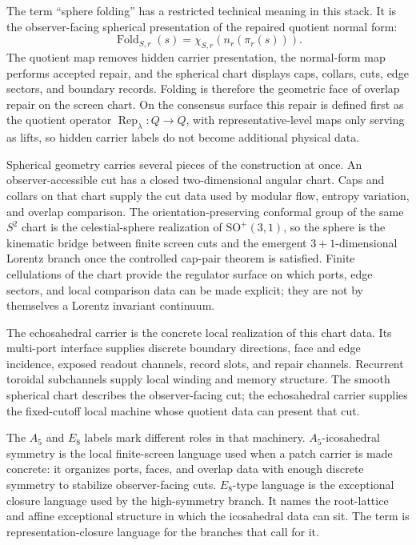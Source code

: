 \documentclass[11pt]{article}
\begin{document}
The term ``sphere folding'' has a restricted technical meaning in this stack. It is the
observer-facing spherical presentation of the repaired quotient normal form:
\[
\operatorname{Fold}_{S,r}(s)=\chi_{S,r}\!\left(n_r(\pi_r(s))\right).
\]
The quotient map removes hidden carrier presentation, the normal-form map performs accepted
repair, and the spherical chart displays caps, collars, cuts, edge sectors, and boundary records.
Folding is therefore the geometric face of overlap repair on the screen chart.
On the consensus surface this repair is defined first as the quotient operator
\(\operatorname{Rep}_\lambda:Q\to Q\), with representative-level maps only serving as lifts, so
hidden carrier labels do not become additional physical data.

Spherical geometry carries several pieces of the construction at once. An observer-accessible cut
has a closed two-dimensional angular chart. Caps and collars on that chart supply the cut data used
by modular flow, entropy variation, and overlap comparison. The orientation-preserving conformal
group of the same \(S^2\) chart is the celestial-sphere realization of
\(\mathrm{SO}^+(3,1)\), so the sphere is the kinematic bridge between finite screen cuts and the
emergent \(3+1\)-dimensional Lorentz branch once the controlled cap-pair theorem is
satisfied. Finite cellulations of the chart provide the regulator surface on which ports, edge
sectors, and local comparison data can be made explicit; they are not by themselves a Lorentz
invariant continuum.

The echosahedral carrier is the concrete local realization of this chart data. Its multi-port
interface supplies discrete boundary directions, face and edge incidence, exposed readout
channels, record slots, and repair channels. Recurrent toroidal subchannels supply local winding
and memory structure. The smooth spherical chart describes the observer-facing cut; the
echosahedral carrier supplies the fixed-cutoff local machine whose quotient data can present that
cut.

The \(A_5\) and \(E_8\) labels mark different roles in that machinery. \(A_5\)-icosahedral symmetry
is the local finite-screen language used when a patch carrier is made concrete: it organizes ports,
faces, and overlap data with enough discrete symmetry to stabilize observer-facing cuts.
\(E_8\)-type language is the exceptional closure language used by the high-symmetry branch. It names
the root-lattice and affine exceptional structure in which the icosahedral data can sit. The term
is representation-closure language for the branches that call for it.
\end{document}
